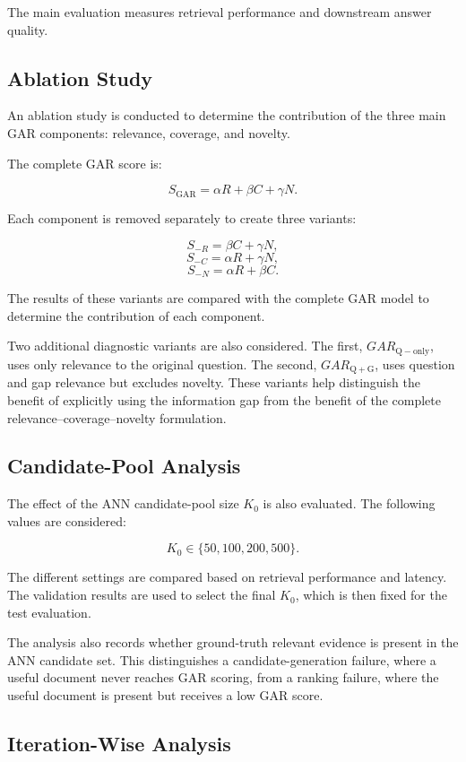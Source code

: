 \documentclass[12pt,a4paper]{report}
\begin{document}
The main evaluation measures retrieval performance and downstream answer quality.

\subsection{Ablation Study}

An ablation study is conducted to determine the contribution of the three main GAR components: relevance, coverage, and novelty.

The complete GAR score is:

\[
S_{\mathrm{GAR}}=\alpha R+\beta C+\gamma N.
\]

Each component is removed separately to create three variants:

\[
S_{-R}=\beta C+\gamma N,
\] \[
S_{-C}=\alpha R+\gamma N,
\] \[
S_{-N}=\alpha R+\beta C.
\]

The results of these variants are compared with the complete GAR model to determine the contribution of each component.

Two additional diagnostic variants are also considered. The first, $GAR_{\mathrm{Q-only}}$, uses only relevance to the original question. The second, $GAR_{\mathrm{Q+G}}$, uses question and gap relevance but excludes novelty. These variants help distinguish the benefit of explicitly using the information gap from the benefit of the complete relevance--coverage--novelty formulation.

\subsection{Candidate-Pool Analysis}

The effect of the ANN candidate-pool size $K_0$ is also evaluated. The following values are considered:

\[
K_0\in\{50,100,200,500\}.
\]

The different settings are compared based on retrieval performance and latency. The validation results are used to select the final $K_0$, which is then fixed for the test evaluation.

The analysis also records whether ground-truth relevant evidence is present in the ANN candidate set. This distinguishes a candidate-generation failure, where a useful document never reaches GAR scoring, from a ranking failure, where the useful document is present but receives a low GAR score.

\subsection{Iteration-Wise Analysis}
\end{document}
